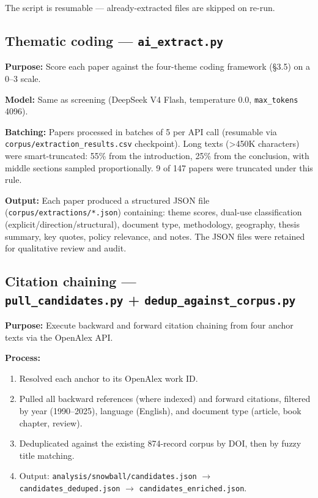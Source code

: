 The script is resumable --- already-extracted files are skipped on re-run.

\subsection{Thematic coding --- \texttt{ai\_extract.py}}

\textbf{Purpose:} Score each paper against the four-theme coding framework (\S 3.5) on a 0--3 scale.

\textbf{Model:} Same as screening (DeepSeek V4 Flash, temperature 0.0, \texttt{max\_tokens} 4096).

\textbf{Batching:} Papers processed in batches of 5 per API call (resumable via \texttt{corpus/\allowbreak extraction\_results.csv} checkpoint). Long texts (>450K characters) were smart-truncated: 55\% from the introduction, 25\% from the conclusion, with middle sections sampled proportionally. 9 of 147 papers were truncated under this rule.

\begin{sloppypar}
\textbf{Output:} Each paper produced a structured JSON file (\texttt{corpus/extractions/*.json}) containing: theme scores, dual-use classification (explicit/direction/structural), document type, methodology, geography, thesis summary, key quotes, policy relevance, and notes. The JSON files were retained for qualitative review and audit.
\end{sloppypar}

\subsection[Citation chaining]{Citation chaining --- \\ \texttt{pull\_candidates.py} + \texttt{dedup\_against\_corpus.py}}

\textbf{Purpose:} Execute backward and forward citation chaining from four anchor texts via the OpenAlex API.

\textbf{Process:}
\begin{enumerate}
  \item Resolved each anchor to its OpenAlex work ID.
  \item Pulled all backward references (where indexed) and forward citations, filtered by year (1990--2025), language (English), and document type (article, book chapter, review).
  \item Deduplicated against the existing 874-record corpus by DOI, then by fuzzy title matching.
  \item Output: \texttt{analysis/snowball/candidates.json} $\rightarrow$ \texttt{candidates\_deduped.json} $\rightarrow$ \texttt{candidates\_enriched.json}.
\end{enumerate}

